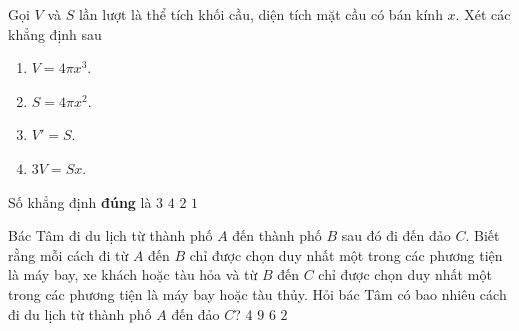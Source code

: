 	\begin{ex}%
	\end{ex}
	
	\begin{ex}%
		Gọi $V$ và $S$ lần lượt là thể tích khối cầu, diện tích mặt cầu có bán kính $x$. Xét các khẳng định sau
		\begin{multicols}{4}
			\begin{enumerate}
				\item $V=4\pi x^3$.		\columnbreak
				\item $S=4\pi x^2$.   	\columnbreak
				\item $V'=S$.			\columnbreak
				\item $3V=Sx$.
			\end{enumerate}
		\end{multicols}
			
		Số khẳng định \textbf{đúng} là
		\choice
		{ \True $3$}
		{$4$}
		{$2$}
		{$1$}
	\end{ex}
	
	\begin{ex}%
		Bác Tâm đi du lịch từ thành phố $A$ đến thành phố $B$ sau đó đi đến đảo $C$. Biết rằng mỗi cách đi từ $A$ đến $B$ chỉ được chọn duy nhất một trong các phương tiện là máy bay, xe khách hoặc tàu hỏa và từ $B$ đến $C$ chỉ được chọn duy nhất một trong các phương tiện là máy bay hoặc tàu thủy. Hỏi bác Tâm có bao nhiêu cách đi du lịch từ thành phố $A$ đến đảo $C$?
		\choice
		{$4$}
		{$9$}
		{\True $6$}
		{$2$}
	\end{ex}
	
